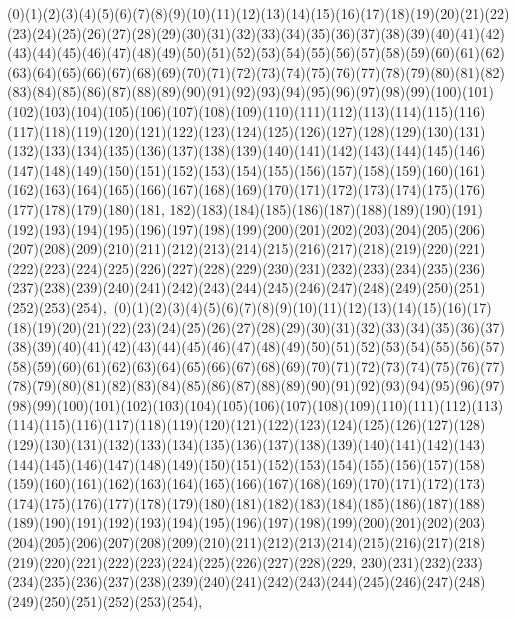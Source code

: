 \documentclass[12pt]{article}
\begin{document}
{(0)(1)(2)(3)(4)(5)(6)(7)(8)(9)(10)(11)(12)(13)(14)(15)(16)(17)(18)(19)(20)(21)(22)(23)(24)(25)(26)(27)(28)(29)(30)(31)(32)(33)(34)(35)(36)(37)(38)(39)(40)(41)(42)(43)(44)(45)(46)(47)(48)(49)(50)(51)(52)(53)(54)(55)(56)(57)(58)(59)(60)(61)(62)(63)(64)(65)(66)(67)(68)(69)(70)(71)(72)(73)(74)(75)(76)(77)(78)(79)(80)(81)(82)(83)(84)(85)(86)(87)(88)(89)(90)(91)(92)(93)(94)(95)(96)(97)(98)(99)(100)(101)(102)(103)(104)(105)(106)(107)(108)(109)(110)(111)(112)(113)(114)(115)(116)(117)(118)(119)(120)(121)(122)(123)(124)(125)(126)(127)(128)(129)(130)(131)(132)(133)(134)(135)(136)(137)(138)(139)(140)(141)(142)(143)(144)(145)(146)(147)(148)(149)(150)(151)(152)(153)(154)(155)(156)(157)(158)(159)(160)(161)(162)(163)(164)(165)(166)(167)(168)(169)(170)(171)(172)(173)(174)(175)(176)(177)(178)(179)(180)(181, 182)(183)(184)(185)(186)(187)(188)(189)(190)(191)(192)(193)(194)(195)(196)(197)(198)(199)(200)(201)(202)(203)(204)(205)(206)(207)(208)(209)(210)(211)(212)(213)(214)(215)(216)(217)(218)(219)(220)(221)(222)(223)(224)(225)(226)(227)(228)(229)(230)(231)(232)(233)(234)(235)(236)(237)(238)(239)(240)(241)(242)(243)(244)(245)(246)(247)(248)(249)(250)(251)(252)(253)(254)$
, 
$
(0)(1)(2)(3)(4)(5)(6)(7)(8)(9)(10)(11)(12)(13)(14)(15)(16)(17)(18)(19)(20)(21)(22)(23)(24)(25)(26)(27)(28)(29)(30)(31)(32)(33)(34)(35)(36)(37)(38)(39)(40)(41)(42)(43)(44)(45)(46)(47)(48)(49)(50)(51)(52)(53)(54)(55)(56)(57)(58)(59)(60)(61)(62)(63)(64)(65)(66)(67)(68)(69)(70)(71)(72)(73)(74)(75)(76)(77)(78)(79)(80)(81)(82)(83)(84)(85)(86)(87)(88)(89)(90)(91)(92)(93)(94)(95)(96)(97)(98)(99)(100)(101)(102)(103)(104)(105)(106)(107)(108)(109)(110)(111)(112)(113)(114)(115)(116)(117)(118)(119)(120)(121)(122)(123)(124)(125)(126)(127)(128)(129)(130)(131)(132)(133)(134)(135)(136)(137)(138)(139)(140)(141)(142)(143)(144)(145)(146)(147)(148)(149)(150)(151)(152)(153)(154)(155)(156)(157)(158)(159)(160)(161)(162)(163)(164)(165)(166)(167)(168)(169)(170)(171)(172)(173)(174)(175)(176)(177)(178)(179)(180)(181)(182)(183)(184)(185)(186)(187)(188)(189)(190)(191)(192)(193)(194)(195)(196)(197)(198)(199)(200)(201)(202)(203)(204)(205)(206)(207)(208)(209)(210)(211)(212)(213)(214)(215)(216)(217)(218)(219)(220)(221)(222)(223)(224)(225)(226)(227)(228)(229, 230)(231)(232)(233)(234)(235)(236)(237)(238)(239)(240)(241)(242)(243)(244)(245)(246)(247)(248)(249)(250)(251)(252)(253)(254)$
, 
$
}
\end{document}
